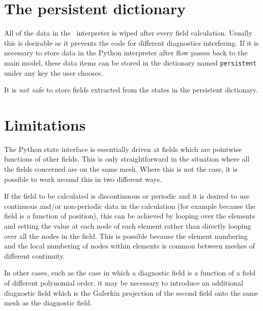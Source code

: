 \section{The persistent dictionary}

All of the data in the \fluidity\ interpreter is wiped after every field
calculation. Usually this is desirable as it prevents the code for different
diagnostics interfering. If it is necessary to store data in the Python
interpreter after flow passes back to the main model, these data items can
be stored in the dictionary named \lstinline[language=Python]+persistent+
under any key the user chooses.

It is \emph{not}\ safe to store fields extracted from the states in the
persistent dictionary. 

\section{Limitations}

The Python state interface is essentially driven at fields which are
pointwise functions of other fields. This is only straightforward in the
situation where all the fields concerned are on the same mesh. Where this is
not the case, it is possible to work around this in two different ways.

If the field to be calculated is discontinuous or periodic and it is desired
to use continuous and/or non-periodic data in the calculation (for example
because the field is a function of position), this can be achieved by
looping over the elements and setting the value at each node of each
element rather than directly looping over all the nodes in the field. This
is possible because the element numbering and the local numbering of nodes within
elements is common between meshes of different continuity. 

In other cases, such as the case in which a diagnostic field is a function
of a field of different polynomial order, it may be necessary to introduce
an additional diagnostic field which is the Galerkin projection of the
second field onto the same mesh as the diagnostic field. 